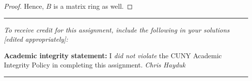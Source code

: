 \documentclass[11pt, reqno]{amsart}
\theoremstyle{plain}
\theoremstyle{definition}
\theoremstyle{example}
\begin{document}
\begin{enumerate}[1.]
\begin{enumerate}[(a)]
\begin{proof}
Hence, $B$ is a matrix ring as well.
\end{proof}

\end{enumerate}
\end{enumerate}

\vfill


\hrule
\emph{\small To receive credit for this assignment, include the following in your solutions [edited appropriately]:}

\smallskip

\textbf{Academic integrity statement:} I \emph{did not violate} the CUNY Academic Integrity Policy in completing this assignment. \hfill \emph{Chris Hayduk}

\medskip
\hrule

\vfill
\end{document}
